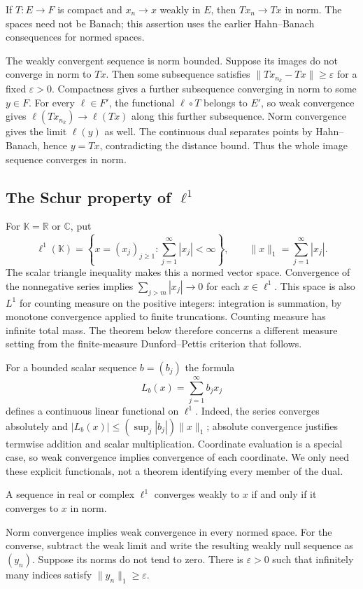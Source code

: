 \begin{proposition}
\label{prop:compact_weak_to_norm}
If $T:E\to F$ is compact and $x_n\to x$ weakly in $E$, then
$Tx_n\to Tx$ in norm. The spaces need not be Banach; this assertion
uses the earlier Hahn--Banach consequences for normed spaces.
\end{proposition}
\Proof
The weakly convergent sequence is norm bounded. Suppose its images do
not converge in norm to $Tx$. Then some subsequence satisfies
$\|Tx_{n_k}-Tx\|\geq\varepsilon$ for a fixed $\varepsilon>0$.
Compactness gives a further subsequence converging in norm to some
$y\in F$. For every $\ell\in F'$, the functional $\ell\circ T$
belongs to $E'$, so weak convergence gives
$\ell(Tx_{n_k})\to\ell(Tx)$ along this further subsequence.
Norm convergence gives the limit $\ell(y)$ as well. The continuous
dual separates points by Hahn--Banach, hence $y=Tx$, contradicting
the distance bound. Thus the whole image sequence converges in norm.
\Done

\subsection{The Schur property of \texorpdfstring{$\ell^1$}{ell-1}}
For $\mathbb K=\mathbb R$ or $\mathbb C$, put
\[
\ell^1(\mathbb K)=
\left\{x=(x_j)_{j\geq1}:\sum_{j=1}^\infty|x_j|<\infty\right\},
\qquad \|x\|_1=\sum_{j=1}^\infty|x_j|.
\]
The scalar triangle inequality makes this a normed vector space.
Convergence of the nonnegative series implies
$\sum_{j>m}|x_j|\to0$ for each $x\in\ell^1$.
This space is also $L^1$ for counting measure on the positive integers:
integration is summation, by monotone convergence applied to finite
truncations. Counting measure has infinite total mass. The theorem
below therefore concerns a different measure setting from the
finite-measure Dunford--Pettis criterion that follows.

For a bounded scalar sequence $b=(b_j)$ the formula
\[
L_b(x)=\sum_{j=1}^\infty b_jx_j
\]
defines a continuous linear functional on $\ell^1$. Indeed, the series
converges absolutely and
$|L_b(x)|\leq(\sup_j|b_j|)\|x\|_1$; absolute convergence justifies
termwise addition and scalar multiplication. Coordinate evaluation is
a special case, so weak convergence implies convergence of each
coordinate. We only need these explicit functionals, not a theorem
identifying every member of the dual.

\begin{theorem}
\label{thm:schur_ell1}
A sequence in real or complex $\ell^1$ converges weakly to $x$ if
and only if it converges to $x$ in norm.
\end{theorem}
\Proof
Norm convergence implies weak convergence in every normed space.
For the converse, subtract the weak limit and write the resulting
weakly null sequence as $(y_n)$. Suppose its norms do not tend to
zero. There is $\varepsilon>0$ such that infinitely many indices
satisfy $\|y_n\|_1\geq\varepsilon$.

